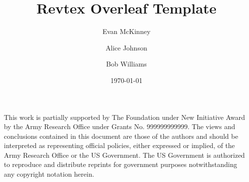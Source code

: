 \documentclass[%
 reprint,
superscriptaddress,
amsmath,amssymb,
aps,
pra,
]{revtex4-2}
\begin{document}

\title{Revtex Overleaf Template}

\author{Evan McKinney}


\author{Alice Johnson}

\author{Bob Williams}

\date{\today}



\maketitle



\begin{acknowledgments}
This work is partially supported by The Foundation under New Initiative Award by the Army Research Office under Grants No. 999999999999. The views and conclusions contained in this document are those of the authors and should be interpreted as representing official policies, either expressed or implied, of the Army Research Office or the US Government. The US Government is authorized to reproduce and distribute reprints for government purposes notwithstanding any copyright notation herein.
\end{acknowledgments}

\nocite{*}

\end{document}
